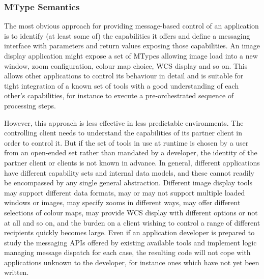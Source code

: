 \documentclass[5p]{elsarticle}
\begin{document}
\subsubsection{MType Semantics}

The most obvious approach for providing message-based control
of an application
is to identify (at least some of) the capabilities it offers and
define a messaging interface with parameters and return values
exposing those capabilities.  An image display application might
expose a set of MTypes allowing image load into a new window,
zoom configuration, colour map choice, WCS display and so on.
This allows other applications to control its behaviour
in detail and is suitable for tight integration of a known set
of tools with a good understanding of each other's capabilities,
for instance to execute a pre-orchestrated sequence of processing steps.

However, this approach is less effective in less predictable environments.
The controlling client needs to understand
the capabilities of its partner client in order to control it.
But if the set of tools in use at runtime is chosen by a
user from an open-ended set
rather than mandated by a developer, the identity of the
partner client or clients is not known in advance.
In general, different applications have different capability sets
and internal data models, and these cannot readily be encompassed
by any single general abstraction.
Different image display tools
may support different data formats,
may or may not support multiple loaded windows or images,
may specify zooms in different ways,
may offer different selections of colour maps,
may provide WCS display with different options or not at all
and so on,
and the burden on a client wishing to control a range
of different recipients quickly becomes large.
Even if an application developer is prepared to study the
messaging APIs offered by existing available tools and implement logic
managing message dispatch for each case,
the resulting code will not cope with applications
unknown to the developer,
for instance ones which have not yet been written.
\end{document}
